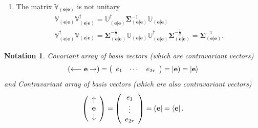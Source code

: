 \documentclass[aps,preprint]{revtex4}%
\newtheorem{notation}[theorem]{Notation}
\begin{document}
\begin{enumerate}
\item The matrix $\mathbb{V}_{\left(  \left.  \mathbf{e}\right\vert
\mathbf{e}\right)  }$ is not unitary
\begin{gather}
\mathbb{V}_{\left(  \left.  \mathbf{e}\right\vert \mathbf{e}\right)
}\mathbb{V}_{\left(  \left.  \mathbf{e}\right\vert \mathbf{e}\right)
}^{\dagger}=\mathbb{U}_{\left(  \left.  \mathbf{e}\right\vert \mathbf{e}%
\right)  }^{\dagger}\mathbf{\Sigma}_{\left(  \left.  \mathbf{e}\right\vert
\mathbf{e}\right)  }^{-1}\mathbb{U}_{\left(  \left.  \mathbf{e}\right\vert
\mathbf{e}\right)  }\\
\mathbb{V}_{\left(  \left.  \mathbf{e}\right\vert \mathbf{e}\right)
}^{\dagger}\mathbb{V}_{\left(  \left.  \mathbf{e}\right\vert \mathbf{e}%
\right)  }=\mathbf{\Sigma}_{\left(  \left.  \mathbf{e}\right\vert
\mathbf{e}\right)  }^{-\frac{1}{2}}\mathbb{U}_{\left(  \left.  \mathbf{e}%
\right\vert \mathbf{e}\right)  }\mathbb{U}_{\left(  \left.  \mathbf{e}%
\right\vert \mathbf{e}\right)  }^{\dagger}\mathbf{\Sigma}_{\left(  \left.
\mathbf{e}\right\vert \mathbf{e}\right)  }^{-\frac{1}{2}}=\mathbf{\Sigma
}_{\left(  \left.  \mathbf{e}\right\vert \mathbf{e}\right)  }^{-1}.
\end{gather}

\end{enumerate}

\begin{notation}
Covariant array of basis vectors (which are contravariant vectors)
\begin{equation}
\left(  \longleftarrow\mathbf{e\rightarrow}\right)  =\left(
\begin{array}
[c]{ccc}%
e_{1} & \cdots & e_{2r}%
\end{array}
\right)  =\left\vert \mathbf{e}\right)  =\left\vert \mathbf{e}\right\rangle
\end{equation}
and Contravariant array of basis vectors (which are also contravariant
vectors)%
\begin{equation}
\left(
\begin{array}
[c]{c}%
\uparrow\\
\mathbf{e}\\
\downarrow
\end{array}
\right)  =\left(
\begin{array}
[c]{c}%
e_{1}\\
\vdots\\
e_{2r}%
\end{array}
\right)  =\left(  \mathbf{e}\right\vert =\left\langle \mathbf{e}\right\vert .
\end{equation}

\end{notation}
\end{document}
